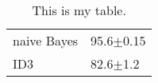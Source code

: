 
\begin{table}
\caption{This is my table.} \label{tab:results}
\begin{center}
\begin{tabular}{ll} \hline
naive Bayes & 95.6$\pm$0.15 \\
ID3 & 82.6$\pm$1.2 \\ \hline
\end{tabular}
\end{center}
\end{table}
